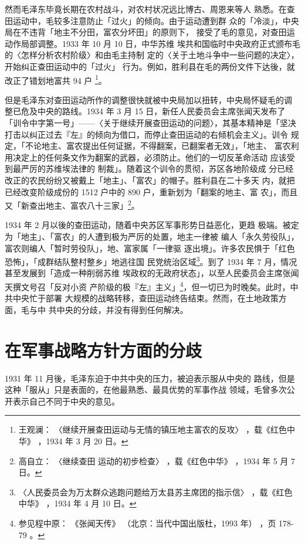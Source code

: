 然而毛泽东毕竟长期在农村战斗，对农村状况远比博古、周恩来等人
熟悉。在查田运动中，毛较多注意防止「过火」的倾向。由于运动遭到群
众的「冷淡」，中央局在不违背「地主不分田，富农分坏田」的原则下，
接受了毛的意见，对查田运动作局部调整。1933 年 10 月 10 日，中华苏维
埃共和国临时中央政府正式颁布毛的〈怎样分析农村阶级〉和由毛主持制
定的〈关于土地斗争中一些问题的决定〉，开始纠正查田运动中的「过火」
行为。例如，胜利县在毛的两份文件下达後，就改正了错划地富共 94 户
\footnote{王观澜：
〈继续开展查田运动与无情的镇压地主富农的反攻〉
，载《红色中华》
，1934 年 3 月 20 日。}。

但是毛泽东对查田运动所作的调整很快就被中央局加以扭转，中央局怀疑毛的调
整已危及中央的路线。1934 年 3 月 15 日，新任人民委员会主席张闻天发布了
「训令中字第一号」——〈关于继续开展查田运动的问题〉，其基本精神是「坚决
打击以纠正过去『左』的倾向为借口，而停止查田运动的右倾机会主义」。训令
规定，「不论地主、富农提出任何证据，不得翻案，已翻案者无效」，「地主、
富农利用决定上的任何条文作为翻案的武器，必须防止。他们的一切反革命活动
应该受到最严厉的苏维埃法律的 制裁」。随着这个训令的贯彻，苏区各地阶级成
分已经改正的农民纷纷又被戴上「地主」、「富农」的帽子。胜利县在二十多天
内，就把已经改变阶级成份的 1512 户中的 890 户，重新划为「翻案的地主、富
农」，而且又「新查出地主、富农八十三家」\footnote{高自立： 〈继续查田
运动的初步检查〉 ，载《红色中华》 ，1934 年 5 月 7 日。}。

1934 年 2 月以後的查田运动，随着中央苏区军事形势日益恶化，更趋
极端。被定为「地主」、「富农」的人遭到极为严厉的处置，地主一律被
编人「永久劳役队」，富农则编人「暂时劳役队」，地、富家属「一律驱
逐出境」。许多农民惧于「红色恐怖」，「成群结队整村整乡」地逃往国
民党统治区域\footnote{ 〈人民委员会为万太群众逃跑问题给万太县苏主席团的指示信〉
，载《红色中华》
，1934 年 4 月 10 日。}。到了 1934 年 7 月，情况甚至发展到「造成一种削弱苏维
埃政权的无政府状态」，以至人民委员会主席张闻天撰文号召「反对小资
产阶级的极『左』主义」\footnote{ 参见程中原：
《张闻天传》
（北京：当代中国出版杜，1993 年）
，页 178-79 。}，但一切已为时晚矣。此时，中共中央忙于部署
大规模的战略转移，查田运动终告结束。然而，在土地政策方面，毛与中
共中央的分歧，并没有得到任何解决。

\section{在军事战略方针方面的分歧}

1931 年 11 月後，毛泽东迫于中共中央的压力，被迫表示服从中央的
路线，但是这种「服从」只是表面的，在他最熟悉、最具优势的军事作战
领域，毛曾多次公开表示自己不同于中央的意见。

